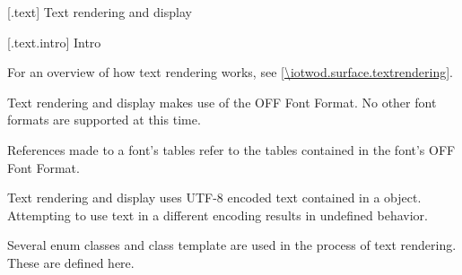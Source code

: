 
 [\iotwod.text] {Text rendering and display}

 [\iotwod.text.intro] {Intro}

\pnum
For an overview of how text rendering works, see \ref{\iotwod.surface.textrendering}.

\pnum
Text rendering and display makes use of the OFF Font Format. No other font formats are supported at this time.

\pnum
References made to a font's tables refer to the tables contained in the font's OFF Font Format.

\pnum
Text rendering and display uses UTF-8 encoded text contained in a  object. Attempting to use text in a different encoding results in undefined behavior.

\pnum
Several enum classes and class template are used in the process of text rendering. These are defined here.

\addtocounter{SectionDepthBase}{1}












\addtocounter{SectionDepthBase}{-1}
